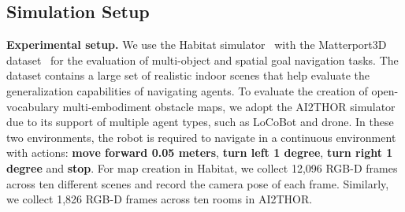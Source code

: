 \documentclass[letterpaper, 10 pt, conference]{ieeeconf}  %
\begin{document}
\subsection{Simulation Setup}
\label{sec:sim_experiments}
\noindent\textbf{Experimental setup.} We use the Habitat simulator~\cite{habitat19iccv} with the Matterport3D dataset~\cite{Matterport3D} for the evaluation of multi-object and spatial goal navigation tasks. The dataset contains a large set of realistic indoor scenes that help evaluate the generalization capabilities of navigating agents. To evaluate the creation of open-vocabulary multi-embodiment obstacle maps, we adopt the AI2THOR simulator due to its support of multiple agent types, such as LoCoBot and drone. In these two environments, the robot is required to navigate in a continuous environment with actions: \textbf{move forward 0.05 meters}, \textbf{turn left 1 degree}, \textbf{turn right 1 degree} and \textbf{stop}. For map creation in Habitat, we collect 12,096 RGB-D frames across ten different scenes and record the camera pose of each frame. Similarly, we collect 1,826 RGB-D frames across ten rooms in AI2THOR.
\end{document}
